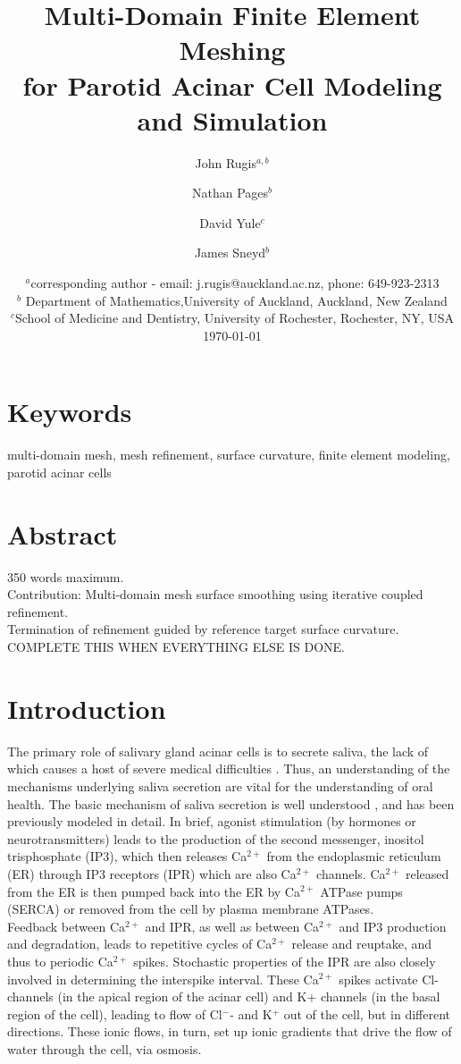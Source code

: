\documentclass[a4paper,10pt]{article}
\title{Multi-Domain Finite Element Meshing\\for Parotid Acinar Cell Modeling and Simulation}
\author{John Rugis$^{a,b}$ \and Nathan Pages$^b$ \and David Yule$^c$ \and James Sneyd$^b$}
\date{%
  $^a$corresponding author - email: j.rugis@auckland.ac.nz, phone: 649-923-2313\\%
  $^b$ Department of Mathematics,University of Auckland, Auckland, New Zealand\\%
  $^c$School of Medicine and Dentistry, University of Rochester, Rochester, NY, USA\\[2ex]%
  \today
}
\begin{document}
\maketitle

\section*{Keywords}
multi-domain mesh, mesh refinement, surface curvature, finite element modeling, parotid acinar cells\\

\section*{Abstract}
350 words maximum.\\
Contribution: Multi-domain mesh surface smoothing using iterative coupled refinement.\\ 
Termination of refinement guided by reference target surface curvature.\\
COMPLETE THIS WHEN EVERYTHING ELSE IS DONE.\\

\section{Introduction}
The primary role of salivary gland acinar cells is to secrete saliva, the lack of which causes a host of severe medical difficulties \cite{fox1985,melvin1991}. Thus, an understanding of the mechanisms underlying saliva secretion are vital for the understanding of oral health.  The basic mechanism of saliva secretion is well understood \cite{nauntofte1992}, and has been previously modeled in detail.
In brief, agonist stimulation (by hormones or neurotransmitters) leads to the production of the second messenger, inositol trisphosphate (IP3), which then releases Ca$^{2+}$ from the endoplasmic reticulum (ER) through IP3 receptors (IPR) which are also Ca$^{2+}$ channels. Ca$^{2+}$ released from the ER is then pumped back into the ER by Ca$^{2+}$ ATPase pumps (SERCA) or removed from the cell by plasma membrane ATPases.\\

Feedback between Ca$^{2+}$ and IPR, as well as between Ca$^{2+}$ and IP3 production and degradation, leads to repetitive cycles of Ca$^{2+}$ release and reuptake, and thus to periodic Ca$^{2+}$ spikes. Stochastic properties of the IPR are also closely involved in determining the interspike interval.
These Ca$^{2+}$ spikes activate Cl- channels (in the apical region of the acinar cell) and K+ channels (in the basal region of the cell), leading to flow of Cl$^{-}$- and K$^{+}$ out of the cell, but in different directions. These ionic flows, in turn, set up ionic gradients that drive the flow of water through the cell, via osmosis.\\
\end{document}
